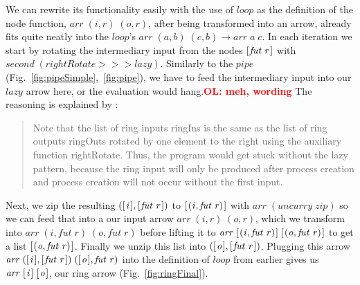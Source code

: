 \documentclass{jfp1}
\newcommand{\Varid}[1]{\mathit{#1}}
\newcommand{\comm}[2]{\textcolor{red}{\bfseries #1: #2}}
\newcommand{\olcomment}[1]{\comm{OL}{#1}}
\begin{document}
We can rewrite its functionality easily with the use of \ensuremath{\Varid{loop}} as the definition of the node function, \ensuremath{\Varid{arr}\;(\Varid{i},\Varid{r})\;(\Varid{o},\Varid{r})}, after being transformed into an arrow, already fits quite neatly into the \ensuremath{\Varid{loop}}'s \ensuremath{\Varid{arr}\;(\Varid{a},\Varid{b})\;(\Varid{c},\Varid{b})\to \Varid{arr}\;\Varid{a}\;\Varid{c}}. In each iteration we start by rotating the intermediary input from the nodes \ensuremath{[\mskip1.5mu \Varid{fut}\;\Varid{r}\mskip1.5mu]} with \ensuremath{\Varid{second}\;(\Varid{rightRotate}\mathbin{>\!\!>\!\!>}\Varid{lazy})}. Similarly to the \ensuremath{\Varid{pipe}} (Fig.~\ref{fig:pipeSimple},~\ref{fig:pipe}), we have to feed the intermediary input into our \ensuremath{\Varid{lazy}} arrow here, or the evaluation would hang.\olcomment{meh, wording} The reasoning is explained by \citet{Loogen2012}:
\begin{quote}
{Note that the list of ring inputs ringIns is the same as the list of ring outputs ringOuts rotated by one element to the right using the auxiliary function rightRotate. Thus, the program would get stuck without the lazy pattern, because the ring input will only be produced after process creation and process creation will not occur without the first input.}
\end{quote}
Next, we zip the resulting \ensuremath{([\mskip1.5mu \Varid{i}\mskip1.5mu],[\mskip1.5mu \Varid{fut}\;\Varid{r}\mskip1.5mu])} to \ensuremath{[\mskip1.5mu (\Varid{i},\Varid{fut}\;\Varid{r})\mskip1.5mu]} with \ensuremath{\Varid{arr}\;(\Varid{uncurry}\;\Varid{zip})} so we can feed that into a our input arrow \ensuremath{\Varid{arr}\;(\Varid{i},\Varid{r})\;(\Varid{o},\Varid{r})}, which we transform into \ensuremath{\Varid{arr}\;(\Varid{i},\Varid{fut}\;\Varid{r})\;(\Varid{o},\Varid{fut}\;\Varid{r})} before lifting it to \ensuremath{\Varid{arr}\;[\mskip1.5mu (\Varid{i},\Varid{fut}\;\Varid{r})\mskip1.5mu]\;[\mskip1.5mu (\Varid{o},\Varid{fut}\;\Varid{r})\mskip1.5mu]} to get a list \ensuremath{[\mskip1.5mu (\Varid{o},\Varid{fut}\;\Varid{r})\mskip1.5mu]}. Finally we unzip this list into \ensuremath{([\mskip1.5mu \Varid{o}\mskip1.5mu],[\mskip1.5mu \Varid{fut}\;\Varid{r}\mskip1.5mu])}. Plugging this arrow \ensuremath{\Varid{arr}\;([\mskip1.5mu \Varid{i}\mskip1.5mu],[\mskip1.5mu \Varid{fut}\;\Varid{r}\mskip1.5mu])\;([\mskip1.5mu \Varid{o}\mskip1.5mu],\Varid{fut}\;\Varid{r})} into the definition of \ensuremath{\Varid{loop}} from earlier gives us \ensuremath{\Varid{arr}\;[\mskip1.5mu \Varid{i}\mskip1.5mu]\;[\mskip1.5mu \Varid{o}\mskip1.5mu]}, our ring arrow (Fig.~\ref{fig:ringFinal}).
\end{document}
